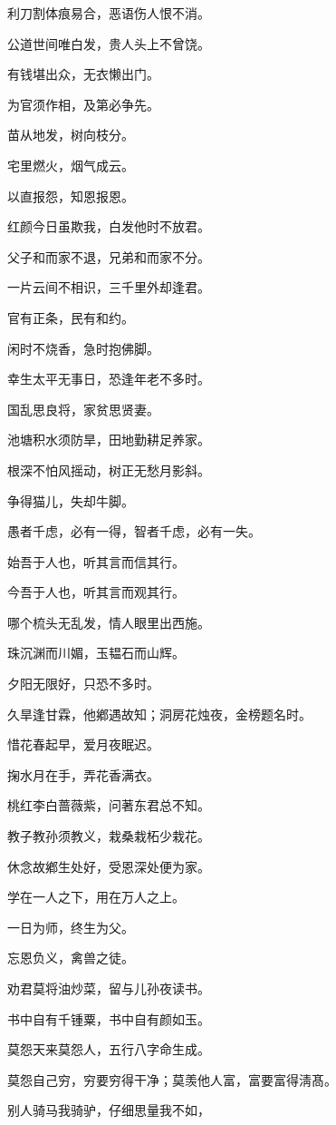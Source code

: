 \documentclass[12pt,oneside]{book}
\begin{document}
利刀割体痕易合，恶语伤人恨不消。

公道世间唯白发，贵人头上不曾饶。

有钱堪出众，无衣懒出门。

为官须作相，及第必争先。

苗从地发，树向枝分。

宅里燃火，烟气成云。

以直报怨，知恩报恩。

红颜今日虽欺我，白发他时不放君。

父子和而家不退，兄弟和而家不分。

一片云间不相识，三千里外却逢君。

官有正条，民有和约。

闲时不烧香，急时抱佛脚。

幸生太平无事日，恐逢年老不多时。

国乱思良将，家贫思贤妻。

池塘积水须防旱，田地勤耕足养家。

根深不怕风摇动，树正无愁月影斜。

争得猫儿，失却牛脚。

愚者千虑，必有一得，智者千虑，必有一失。

始吾于人也，听其言而信其行。

今吾于人也，听其言而观其行。

哪个梳头无乱发，情人眼里出西施。

珠沉渊而川媚，玉韫石而山辉。

夕阳无限好，只恐不多时。

久旱逢甘霖，他鄕遇故知；洞房花烛夜，金榜题名时。

惜花春起早，爱月夜眠迟。

掬水月在手，弄花香满衣。

桃红李白蔷薇紫，问著东君总不知。

教子教孙须教义，栽桑栽柘少栽花。

休念故鄕生处好，受恩深处便为家。

学在一人之下，用在万人之上。

一日为师，终生为父。

忘恩负义，禽兽之徒。

劝君莫将油炒菜，留与儿孙夜读书。

书中自有千锺粟，书中自有颜如玉。

莫怨天来莫怨人，五行八字命生成。

莫怨自己穷，穷要穷得干净；莫羡他人富，富要富得淸髙。

别人骑马我骑驴，仔细思量我不如，
\end{document}
